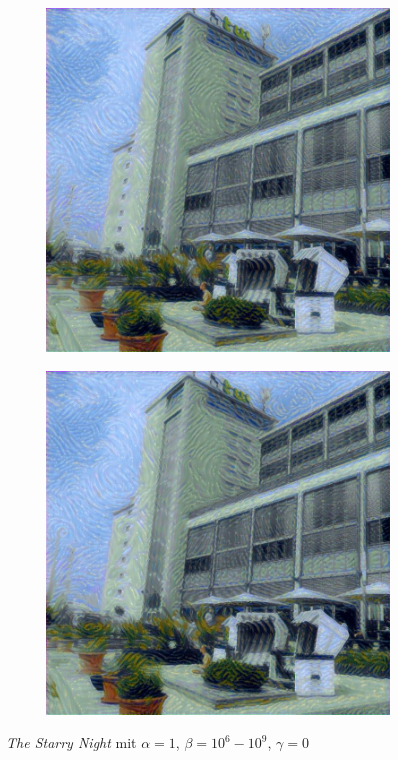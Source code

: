 \begin{figure}[H]
\begin{subfigure}[h]{0.24\textwidth}
    \end{subfigure}
    \begin{subfigure}[h]{0.24\textwidth}
        \centering
        \includegraphics[width=\textwidth]{resources/content/experiments/a__the_starry_night__768x768__style-weight_1e+08__tv-weight_0e+00.jpg}
    \end{subfigure}
    \begin{subfigure}[h]{0.24\textwidth}
        \centering
        \includegraphics[width=\textwidth]{resources/content/experiments/a__the_starry_night__768x768__style-weight_1e+09__tv-weight_0e+00.jpg}
    \end{subfigure}
    \caption{\textit{The Starry Night} mit $ \alpha = 1 $, $ \beta = 10^{6} - 10^{9} $, $ \gamma = 0 $}
\end{figure}

